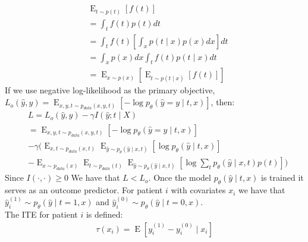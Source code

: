 \documentclass[oneside,12pt]{article}
\begin{document}
\\\\
\begin{equation*}
    \begin{split}
        &\operatorname{E}_{t \sim p(t)}\left[f(t)\right]\\
        &= \int_t f(t)p(t)dt\\
        &= \int_t f(t) \left[ \int_x p(t \mid x) p(x) dx \right]dt\\
        &= \int_x p(x)dx \int_t f(t) p(t \mid x) dt\\
        &= \operatorname{E}_{x \sim p(x)} \left[ \operatorname{E}_{t \sim p(t \mid x)} \left[ f(t)\right]\right]
    \end{split}
\end{equation*}
%
If we use negative log-likelihood as the primary objective, $L_o(\hat{y}, y) = \operatorname{E}_{x,y,t \sim p_{data}(x,y,t)}\left[-\operatorname{log}p_\theta(\hat{y}=y \mid t,x)\right]$, then:
\begin{equation}\label{eq:lossExplicit}
    \begin{split}
        &L = L_o(\hat{y}, y) - \gamma I(\hat{y};t \mid X)\\
        &= \operatorname{E}_{x,y,t \sim p_{data}(x,y,t)}\left[-\operatorname{log}p_\theta(\hat{y}=y \mid t,x)\right]\\ 
        &- \gamma (\operatorname{E}_{x,t \sim p_{data}(x,t)} \operatorname{E}_{\hat{y} \sim p_\theta(\hat{y} \mid x,t)} \left[ \operatorname{log} p_\theta(\hat{y} \mid t,x) \right]\\
        &-\operatorname{E}_{x \sim p_{data}(x)} \operatorname{E}_{t \sim p_{data}(t)} \operatorname{E}_{\hat{y} \sim p_\theta(\hat{y} \mid x,t)} \left[ \operatorname{log} \sum_t p_\theta(\hat{y} \mid x, t)p(t) \right])
    \end{split}
\end{equation}
%
Since $I(\cdot,\cdot) \geq 0$ We have that $L < L_o$. Once the model $p_\theta(\hat{y} \mid t,x)$ is trained it serves as an outcome predictor. For patient $i$ with covariates $x_i$ we have that $\hat{y}_i^{(1)} \sim p_\theta(\hat{y} \mid t=1,x)$ and $\hat{y}_i^{(0)} \sim p_\theta(\hat{y} \mid t=0,x)$.\\
The ITE for patient $i$ is defined:
\begin{equation}
    \begin{split}
        \tau(x_i) = \operatorname{E}\left[y_i^{(1)}-y_i^{(0)} \mid x_i \right]
    \end{split}
\end{equation}
\end{document}
